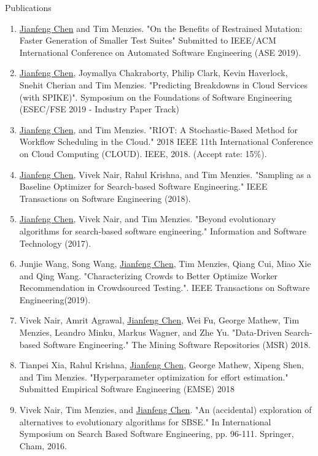 \documentclass{resume} %
\begin{document}
\begin{rSection}{ Publications} 
\begin{enumerate}[wide, labelwidth=!, labelindent=0pt]
\item \underline{Jianfeng Chen} and Tim Menzies. "On the Benefits of Restrained Mutation: Faster Generation of Smaller Test Suites" Submitted to IEEE/ACM International Conference on Automated Software Engineering (ASE 2019).
\item \underline{Jianfeng Chen}, Joymallya Chakraborty, Philip Clark, Kevin Haverlock, Snehit Cherian and Tim Menzies. "Predicting Breakdowns in Cloud Services (with SPIKE)". Symposium on the Foundations of Software Engineering (ESEC/FSE 2019 - Industry Paper Track)
\item \underline{Jianfeng Chen}, and Tim Menzies. "RIOT: A Stochastic-Based Method for Workflow Scheduling in the Cloud." 2018 IEEE 11th International Conference on Cloud Computing (CLOUD). IEEE, 2018. (Accept rate: 15\%).
\item \underline{Jianfeng Chen}, Vivek Nair, Rahul Krishna, and Tim Menzies. "Sampling as a Baseline Optimizer for Search-based Software Engineering." IEEE Transactions on Software Engineering (2018).
\item \underline{Jianfeng Chen}, Vivek Nair, and Tim Menzies. "Beyond evolutionary algorithms for search-based software engineering." Information and Software Technology (2017).

\item Junjie Wang, Song Wang, \underline{Jianfeng Chen}, Tim Menzies, Qiang Cui, Miao Xie and  Qing Wang. "Characterizing Crowds to Better Optimize Worker Recommendation in Crowdsourced Testing.". IEEE Transactions on Software Engineering(2019).
\item Vivek Nair, Amrit Agrawal, \underline{Jianfeng Chen}, Wei Fu, George Mathew, Tim Menzies, Leandro Minku, Markus Wagner, and Zhe Yu. "Data-Driven Search-based Software Engineering." The Mining Software Repositories (MSR) 2018.
\item Tianpei Xia, Rahul Krishna, \underline{Jianfeng Chen}, George Mathew, Xipeng Shen, and Tim Menzies. "Hyperparameter optimization for effort estimation." Submitted Empirical Software Engineering (EMSE) 2018
\item Vivek Nair, Tim Menzies, and \underline{Jianfeng Chen}. "An (accidental) exploration of alternatives to evolutionary algorithms for SBSE." In International Symposium on Search Based Software Engineering, pp. 96-111. Springer, Cham, 2016.
\end{enumerate}
\end{rSection}
\end{document}
